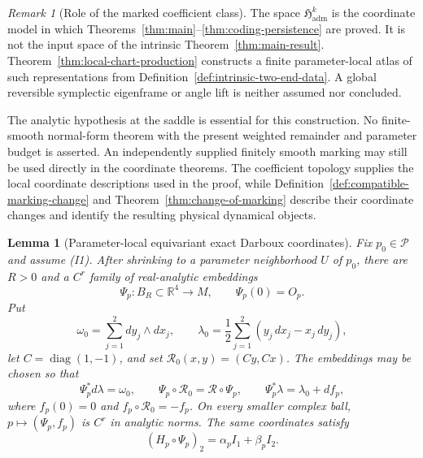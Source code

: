 \documentclass[11pt]{amsart}
\numberwithin{equation}{section}
\newtheorem{lemma}[theorem]{Lemma}
\theoremstyle{definition}
\theoremstyle{remark}
\newtheorem{remark}[theorem]{Remark}
\begin{document}
\begin{remark}[Role of the marked coefficient class]
The space $\mathfrak H_{\mathrm{adm}}^k$ is the coordinate model in which
Theorems~\ref{thm:main}--\ref{thm:coding-persistence} are proved.  It is
not the input space of the intrinsic Theorem~\ref{thm:main-result}.
Theorem~\ref{thm:local-chart-production} constructs a finite parameter-local
atlas of such representations from
Definition~\ref{def:intrinsic-two-end-data}.  A global reversible
symplectic eigenframe or angle lift is neither assumed nor concluded.

The analytic hypothesis at the saddle is essential for this construction.
No finite-smooth normal-form theorem with the present weighted remainder and
parameter budget is asserted.  An independently supplied finitely smooth
marking may still be used directly in the coordinate theorems.  The
coefficient topology supplies the local coordinate descriptions used in
the proof, while
Definition~\ref{def:compatible-marking-change} and
Theorem~\ref{thm:change-of-marking} describe their coordinate changes and
identify the resulting physical dynamical objects.
\end{remark}

\begin{lemma}[Parameter-local equivariant exact Darboux coordinates]
\label{lem:parametric-equivariant-darboux}
Fix $p_0\in\mathcal P$ and assume \textup{(I1)}.  After shrinking to a
parameter neighborhood $U$ of $p_0$, there are $R>0$ and a $C^r$ family
of real-analytic embeddings
\[
 \Psi_p:B_R\subset\mathbb R^4\longrightarrow M,\qquad
 \Psi_p(0)=O_p .
\]
Put
\[
 \omega_0=\sum_{j=1}^2dy_j\wedge dx_j,\qquad
 \lambda_0=\frac12\sum_{j=1}^2(y_j\,dx_j-x_j\,dy_j),
\]
let $C=\operatorname{diag}(1,-1)$, and set
$\mathcal R_0(x,y)=(Cy,Cx)$.  The embeddings may be chosen so that
\begin{equation}\label{eq:parametric-equivariant-darboux}
 \Psi_p^*d\lambda=\omega_0,\qquad
 \Psi_p\circ\mathcal R_0=\mathcal R\circ\Psi_p,\qquad
 \Psi_p^*\lambda=\lambda_0+df_p ,
\end{equation}
where $f_p(0)=0$ and
$f_p\circ\mathcal R_0=-f_p$.  On every smaller complex ball,
$p\mapsto(\Psi_p,f_p)$ is $C^r$ in analytic norms.
The same coordinates satisfy
\begin{equation}\label{eq:parametric-darboux-quadratic-part}
 (H_p\circ\Psi_p)_2=\alpha_pI_1+\beta_pI_2.
\end{equation}
\end{lemma}
\end{document}
